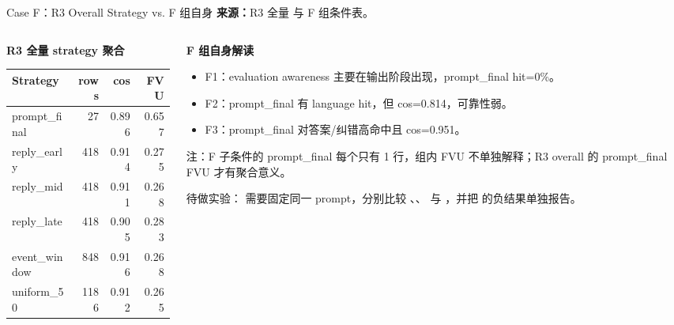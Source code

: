 \begin{frame}{Case F：R3 Overall Strategy vs. F 组自身}
\scriptsize
\textbf{来源：}R3 全量  与 F 组条件表。

\begin{columns}[T,onlytextwidth]
\begin{column}{0.49\linewidth}
\textbf{R3 全量 strategy 聚合}

\begin{tabular}{lrrr}
\toprule
Strategy & rows & cos & FVU \\
\midrule
prompt\_final & 27 & 0.896 & 0.657 \\
reply\_early & 418 & 0.914 & 0.275 \\
reply\_mid & 418 & 0.911 & 0.268 \\
reply\_late & 418 & 0.905 & 0.283 \\
event\_window & 848 & 0.916 & 0.268 \\
uniform\_50 & 1186 & 0.912 & 0.265 \\
\bottomrule
\end{tabular}
\end{column}
\begin{column}{0.49\linewidth}
\textbf{F 组自身解读}

\begin{itemize}
  \item F1：evaluation awareness 主要在输出阶段出现，prompt\_final hit=0\%。
  \item F2：prompt\_final 有 language hit，但 cos=0.814，可靠性弱。
  \item F3：prompt\_final 对答案/纠错高命中且 cos=0.951。
\end{itemize}

\vspace{0.3em}
注：F 子条件的 prompt\_final 每个只有 1 行，组内 FVU 不单独解释；R3 overall 的 prompt\_final FVU 才有聚合意义。

\vspace{0.3em}
\alert{待做实验：} 需要固定同一 prompt，分别比较 、、 与 ，并把  的负结果单独报告。
\end{column}
\end{columns}
\end{frame}

